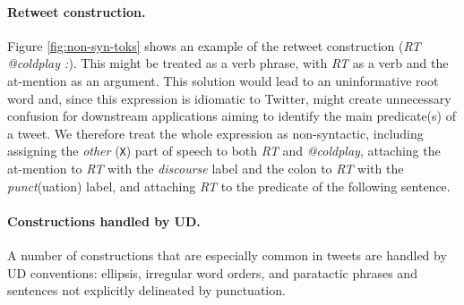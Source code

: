 \documentclass[11pt,a4paper]{article}
\newcommand{\yjcomment}[1]{\textcolor{orange}{[$_\mathrm{L}^\mathrm{Y}$#1]}}
\newcommand{\nascomment}[1]{\textcolor{blue}{[#1 ---\textsc{nas}]}}
\newcommand{\yicomment}[1]{\textcolor{gray}{[#1 ---\textsc{yi}]}}
\begin{document}
\paragraph{Retweet construction.} Figure \ref{fig:non-syn-toks} shows
an example of the retweet construction (\emph{RT @coldplay :}).  This
might be treated as a verb phrase, with \emph{RT} as a verb and the
at-mention as an argument.
  This solution would lead to an uninformative root
word and, since this expression is idiomatic to Twitter, might create
unnecessary confusion for downstream applications aiming to identify
the main predicate(s) of a tweet.  We therefore treat the whole
expression as non-syntactic, including assigning the \emph{other}
(\texttt{X}) part of speech to both \emph{RT} and \emph{@coldplay},
attaching the at-mention to \emph{RT} with the \emph{discourse}
label and the colon to \emph{RT} with the \emph{punct}(uation) label,
and attaching \emph{RT} to the predicate of the following sentence.



\paragraph{Constructions handled by UD.}  A number of constructions
that are especially common in tweets are handled by UD
conventions: ellipsis, irregular word orders, and paratactic phrases
and sentences 
not explicitly delineated by punctuation.
	
\end{document}
